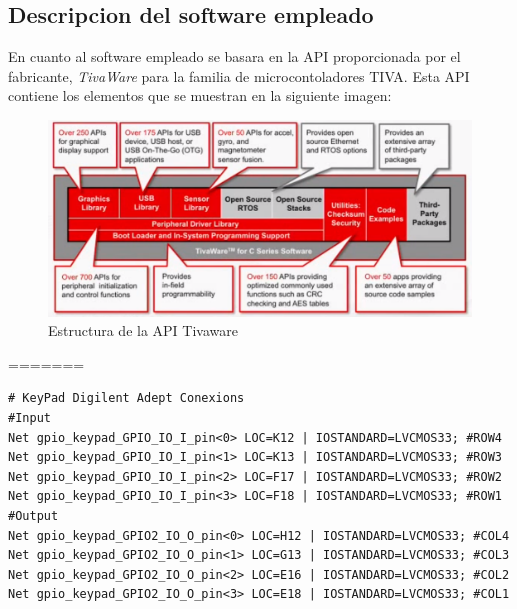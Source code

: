 \documentclass[a4paper,twoside]{article}
\begin{document}
\subsection{Descripcion del software empleado}
En cuanto al software empleado se basara en la API proporcionada por el fabricante, \textit{TivaWare} para la familia de microcontoladores TIVA. Esta API contiene los elementos que se muestran en la siguiente imagen:\\
\begin{figure}[h!]
 \centering
 \includegraphics[width=.8\textwidth]{../images/tivaware_struct}
 \caption{Estructura de la API Tivaware}
\end{figure}
=======
\begin{verbatim}
# KeyPad Digilent Adept Conexions
#Input
Net gpio_keypad_GPIO_IO_I_pin<0> LOC=K12 | IOSTANDARD=LVCMOS33; #ROW4
Net gpio_keypad_GPIO_IO_I_pin<1> LOC=K13 | IOSTANDARD=LVCMOS33; #ROW3
Net gpio_keypad_GPIO_IO_I_pin<2> LOC=F17 | IOSTANDARD=LVCMOS33; #ROW2
Net gpio_keypad_GPIO_IO_I_pin<3> LOC=F18 | IOSTANDARD=LVCMOS33; #ROW1
#Output
Net gpio_keypad_GPIO2_IO_O_pin<0> LOC=H12 | IOSTANDARD=LVCMOS33; #COL4
Net gpio_keypad_GPIO2_IO_O_pin<1> LOC=G13 | IOSTANDARD=LVCMOS33; #COL3
Net gpio_keypad_GPIO2_IO_O_pin<2> LOC=E16 | IOSTANDARD=LVCMOS33; #COL2
Net gpio_keypad_GPIO2_IO_O_pin<3> LOC=E18 | IOSTANDARD=LVCMOS33; #COL1
\end{verbatim}
\end{document}
